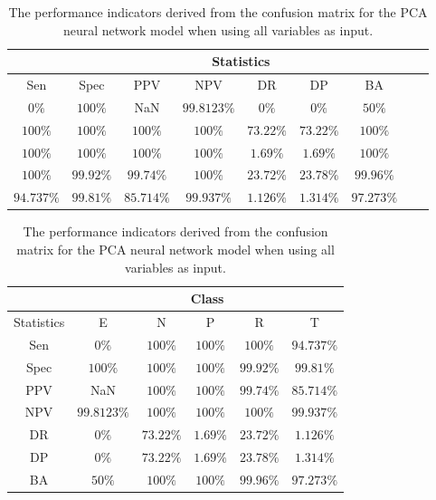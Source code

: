 \begin{table}[!ht]
	\centering
	\begin{tabular}{|c|c|c|c|c|c|c|c|c|}
		\hline
		 & \multicolumn{7}{c|}{Statistics} \\ \hline
		Sen & Spec & PPV & NPV & DR & DP & BA \\ \hline
		$0\%$ & $100\%$ & NaN & $99.8123\%$ & $0\%$ & $0\%$ & $50\%$ \\ \hline
		$100\%$ & $100\%$ & $100\%$ & $100\%$ & $73.22\%$ & $73.22\%$ & $100\%$ \\ \hline
		$100\%$ & $100\%$ & $100\%$ & $100\%$ & $1.69\%$ & $1.69\%$ & $100\%$ \\ \hline
		$100\%$ & $99.92\%$ & $99.74\%$ & $100\%$ & $23.72\%$ & $23.78\%$ & $99.96\%$ \\ \hline
		$94.737\%$ & $99.81\%$ & $85.714\%$ & $99.937\%$ & $1.126\%$ & $1.314\%$ & $97.273\%$ \\ \hline
	\end{tabular}
	\caption{The performance indicators derived from the confusion matrix for the PCA neural network model when using all variables as input.}
	\label{tab:cs:all:pcaNNet}
\end{table}

\begin{table}[!ht]
	\centering
	\begin{tabular}{|c|c|c|c|c|c|}
		\hline
		 & \multicolumn{5}{c|}{Class} \\ \hline
		Statistics & E & N & P & R & T \\ \hline
		Sen & $0\%$ & $100\%$ & $100\%$ & $100\%$ & $94.737\%$ \\ \hline
		Spec & $100\%$ & $100\%$ & $100\%$ & $99.92\%$ & $99.81\%$ \\ \hline
		PPV & NaN & $100\%$ & $100\%$ & $99.74\%$ & $85.714\%$ \\ \hline
		NPV & $99.8123\%$ & $100\%$ & $100\%$ & $100\%$ & $99.937\%$ \\ \hline
		DR & $0\%$ & $73.22\%$ & $1.69\%$ & $23.72\%$ & $1.126\%$ \\ \hline
		DP & $0\%$ & $73.22\%$ & $1.69\%$ & $23.78\%$ & $1.314\%$ \\ \hline
		BA & $50\%$ & $100\%$ & $100\%$ & $99.96\%$ & $97.273\%$ \\ \hline
	\end{tabular}
	\caption{The performance indicators derived from the confusion matrix for the PCA neural network model when using all variables as input.}
	\label{tab:cs:reverse:all:pcaNNet}
\end{table}
